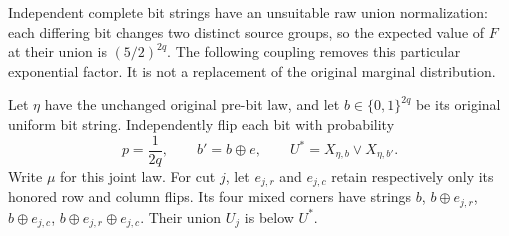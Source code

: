 \documentclass[11pt]{article}
\begin{document}
Independent complete bit strings have an unsuitable raw union
normalization: each differing bit changes two distinct source groups,
so the expected value of $F$ at their union is $(5/2)^{2q}$.
The following coupling removes this particular exponential factor.
It is not a replacement of the original marginal distribution.

Let $\eta$ have the unchanged original pre-bit law, and let
$b\in\{0,1\}^{2q}$ be its original uniform bit string. Independently
flip each bit with probability
\[
 p=\frac1{2q},\qquad b'=b\mathbin{\oplus}e,\qquad
 U^*=X_{\eta,b}\vee X_{\eta,b'} .
\]
Write $\mu$ for this joint law. For cut $j$, let $e_{j,r}$ and
$e_{j,c}$ retain respectively only its honored row and column flips.
Its four mixed corners have strings
$b$, $b\oplus e_{j,r}$, $b\oplus e_{j,c}$,
$b\oplus e_{j,r}\oplus e_{j,c}$.
Their union $U_j$ is below $U^*$.
\end{document}
